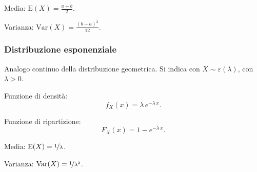 \documentclass{article}
\theoremstyle{definition}
\newcommand{\E}{\text{E}}
\newcommand{\Var}{\text{Var}}
\begin{document}
                Media: \(\E(X) = \frac{a+b}{2}\).

                Varianza: \(\Var(X) = \frac{{(b - a)}^2}{12}\).

            \subsubsection{Distribuzione esponenziale}

                Analogo continuo della distribuzione geometrica. Si indica con \(X \sim \varepsilon(\lambda)\), con
                \(\lambda > 0\).

                Funzione di densità:
                \[
                    f_X (x) = \lambda \, e^{-\lambda \, x}.
                \]

                Funzione di ripartizione:
                \[
                    F_X (x) = 1 - e^{-\lambda \, x}.
                \]

                Media: \(\E(X) = \nicefrac{1}{\lambda}\).

                Varianza: \(\Var(X) = \nicefrac{1}{\lambda^2}\).
\end{document}
